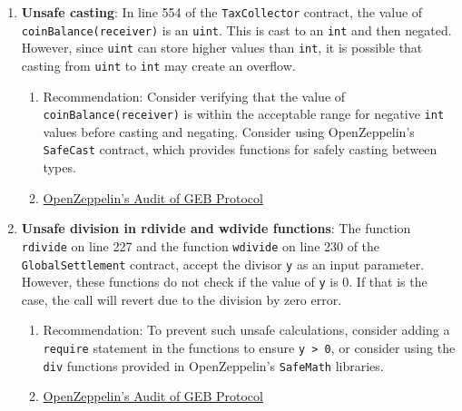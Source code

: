 \begin{enumerate}
\item\textbf{Unsafe casting}: In line 554 of the \verb|TaxCollector| contract, the value of \verb|coinBalance(receiver)| is an \verb|uint|. This is cast to an \verb|int| and then negated. However, since \verb|uint| can store higher values than \verb|int|, it is possible that casting from \verb|uint| to \verb|int| may create an overflow.
	\begin{enumerate}
	\item Recommendation: Consider verifying that the value of \verb|coinBalance(receiver)| is within the acceptable range for negative \verb|int| values before casting and negating. Consider using OpenZeppelin’s \verb|SafeCast| contract, which provides functions for safely casting between types.
	\item\href{https://blog.openzeppelin.com/geb-protocol-audit/}{OpenZeppelin's Audit of GEB Protocol}
	\end{enumerate}

\item\textbf{Unsafe division in rdivide and wdivide functions}: The function \verb|rdivide| on line 227 and the function \verb|wdivide| on line 230 of the \verb|GlobalSettlement| contract, accept the divisor \verb|y| as an input parameter. However, these functions do not check if the value of \verb|y| is 0. If that is the case, the call will revert due to the division by zero error.
	\begin{enumerate}
	\item Recommendation: To prevent such unsafe calculations, consider adding a \verb|require| statement in the functions to ensure \verb|y > 0|, or consider using the \verb|div| functions provided in OpenZeppelin’s \verb|SafeMath| libraries.
	\item\href{https://blog.openzeppelin.com/geb-protocol-audit/}{OpenZeppelin's Audit of GEB Protocol}
	\end{enumerate}


\end{enumerate}
